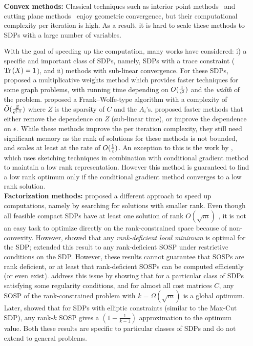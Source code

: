 \noindent \textbf{Convex methods:}
Classical techniques such as interior point methods~\citep{ nesterov1989self, nesterov1988polynomial, alizadeh1995interior} and cutting plane methods~\citep{anstreicher2000volumetric,krishnan2003properties} enjoy geometric convergence, but their computational complexity per iteration is high. As a result, it is hard to scale these methods to SDPs with a large number of variables.

With the goal of speeding up the computation, many works have considered: i) a specific and important class of SDPs, namely, SDPs with a trace constraint ($\mathrm{Tr}\left(X\right)=1$), and ii) methods with sub-linear convergence. For these SDPs, \citet{arora2005fast} proposed a multiplicative weights method which provides faster techniques for some graph problems, with running time depending on $O(\frac{1}{\epsilon^2})$ and the \textit{width} of the problem.  \citet{hazan2008sparse} proposed a Frank--Wolfe-type algorithm with a complexity of $\tilde{O}( \frac{Z}{\epsilon^{3.5}})$ where $Z$ is the sparsity of $C$ and the $A_i$'s.  \citet{garber2016sublinear, garber2016faster}  proposed faster methods that either remove the dependence on $Z$ (sub-linear time), or improve the dependence on $\epsilon$. While these methods improve the per iteration complexity, they still need significant memory as the rank of solutions for these methods is not bounded, and scales at least at the rate of $O(\frac{1}{\epsilon})$.  An exception to this is the work by \citet{yurtsever2017sketchy}, which uses sketching techniques in combination with conditional gradient method to maintain a low rank representation. However this method is guaranteed to find a low rank optimum only if the conditional gradient method converges to a low rank solution. \\

\noindent \textbf{Factorization methods:}
\citet{burer2003nonlinear, burer2005local} proposed a different approach to speed up computations, namely by searching for solutions with smaller rank.  Even though all feasible compact SDPs have at least one solution of rank $O(\sqrt{m})$ \citep{barvinok1995problems, pataki1998rank}, it is not an easy task to optimize directly on the rank-constrained space because of non-convexity. However,  \citet{burer2003nonlinear, burer2005local} showed that any \emph{rank-deficient local minimum} is optimal for the SDP; \citet{journee2010low} extended this result to any rank-deficient SOSP under restrictive conditions on the SDP. However, these results cannot guarantee that SOSPs are rank deficient, or at least that rank-deficient SOSPs can be computed efficiently (or even exist). \citet{boumal2016non} address this issue by showing that for a particular class of SDPs satisfying some regularity conditions, and for almost all cost matrices $C$, any SOSP of the rank-constrained problem with $k = \Omega(\sqrt{m})$ is a global optimum. Later, \citet{pmlr-v65-mei17a} showed that for SDPs with elliptic constraints (similar to the Max-Cut SDP), any rank-$k$ SOSP gives a $(1-\frac{1}{k-1})$ approximation to the optimum value. Both these results are specific to particular classes of SDPs and do not extend to general problems.
 
